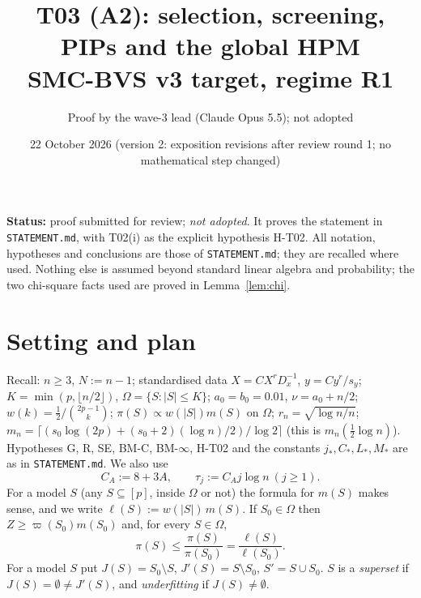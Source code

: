 \documentclass[11pt]{article}
\title{T03 (A2): selection, screening, PIPs and the global HPM\\\large SMC-BVS v3 target, regime R1}
\author{Proof by the wave-3 lead (Claude Opus 5.5); not adopted}
\date{22 October 2026 \quad(version 2: exposition revisions after review round 1; no mathematical step changed)}
\theoremstyle{definition}
\newcommand{\1}{\mathbf 1}
\begin{document}
\maketitle
\noindent\textbf{Status:} proof submitted for review; \emph{not adopted}. It proves the statement in \texttt{STATEMENT.md}, with T02(i) as the explicit hypothesis H-T02. All notation, hypotheses and conclusions are those of \texttt{STATEMENT.md}; they are recalled where used. Nothing else is assumed beyond standard linear algebra and probability; the two chi-square facts used are proved in Lemma~\ref{lem:chi}.

\tableofcontents

\section{Setting and plan}

Recall: $n\ge3$, $N:=n-1$; standardised data $X=CX^rD_x^{-1}$, $y=Cy^r/s_y$; $K=\min(p,\lfloor n/2\rfloor)$, $\Omega=\{S:|S|\le K\}$; $a_0=b_0=0.01$, $\nu=a_0+n/2$; $w(k)=\tfrac12/\binom{2p-1}{k}$; $\pi(S)\propto w(|S|)m(S)$ on $\Omega$; $r_n=\sqrt{\log n/n}$; $m_n=\lceil(s_0\log(2p)+(s_0+2)(\log n)/2)/\log2\rceil$ (this is $m_n(\frac12\log n)$). Hypotheses G, R, SE, BM-C, BM-$\infty$, H-T02 and the constants $j_*,C_*,L_*,M_*$ are as in \texttt{STATEMENT.md}. We also use
\[
C_A:=8+3A,\qquad \tau_j:=C_Aj\log n\ (j\ge1).
\]
For a model $S$ (any $S\subseteq[p]$, inside $\Omega$ or not) the formula for $m(S)$ makes sense, and we write $\ell(S):=w(|S|)\,m(S)$. If $S_0\in\Omega$ then $Z\ge\varpi(S_0)m(S_0)$ and, for every $S\in\Omega$,
\begin{equation}\label{eq:ratio}
\pi(S)\le\frac{\pi(S)}{\pi(S_0)}=\frac{\ell(S)}{\ell(S_0)} .
\end{equation}
For a model $S$ put $J(S)=S_0\setminus S$, $J'(S)=S\setminus S_0$, $S'=S\cup S_0$. $S$ is a \emph{superset} if $J(S)=\emptyset\ne J'(S)$, and \emph{underfitting} if $J(S)\ne\emptyset$.
\end{document}
